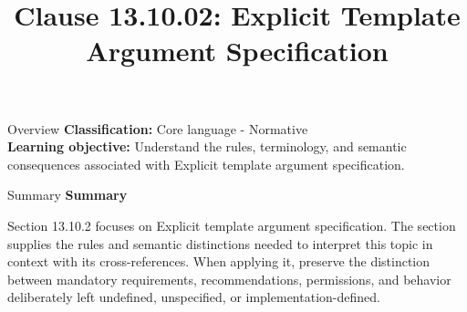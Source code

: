 \documentclass[10pt,letterpaper]{article}
\title{Clause 13.10.02: Explicit Template Argument Specification}
\author{}
\date{}
\begin{document}
\maketitle
\begin{CornellOverviewBox}{Overview}
\textbf{Classification:} Core language - Normative\\[2pt]
\textbf{Learning objective:} Understand the rules, terminology, and semantic consequences associated with Explicit template argument specification.
\end{CornellOverviewBox}\begin{CornellSummaryBox}{Summary}
{\sffamily\bfseries\color{Accent} Summary}\par\vspace{3pt}Section 13.10.2 focuses on Explicit template argument specification. The section supplies the rules and semantic distinctions needed to interpret this topic in context with its cross-references. When applying it, preserve the distinction between mandatory requirements, recommendations, permissions, and behavior deliberately left undefined, unspecified, or implementation-defined.
\end{CornellSummaryBox}
\end{document}
